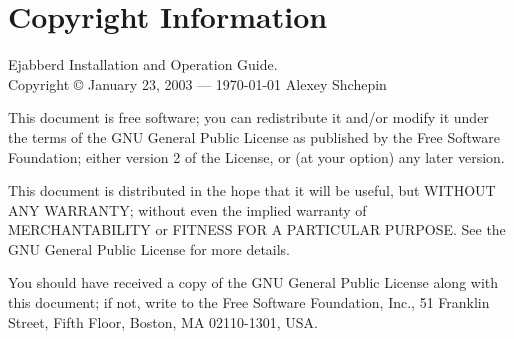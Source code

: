 \documentclass[a4paper,10pt]{article}
\newcommand{\ind}[1]{\begin{latexonly}\index{#1}\end{latexonly}}
\newcommand{\bracehack}{\def\{{\char"7B}\def\}{\char"7D}}
\newcommand{\titem}[1]{\item[\bracehack\texttt{#1}]}
\newcommand{\Jabber}{Jabber}
\begin{document}
\section{Copyright Information}
\label{copyright}

Ejabberd Installation and Operation Guide.\\
Copyright \copyright{} January 23, 2003 --- \today{} Alexey Shchepin

This document is free software; you can redistribute it and/or
modify it under the terms of the GNU General Public License
as published by the Free Software Foundation; either version 2
of the License, or (at your option) any later version.

This document is distributed in the hope that it will be useful,
but WITHOUT ANY WARRANTY; without even the implied warranty of
MERCHANTABILITY or FITNESS FOR A PARTICULAR PURPOSE. See the
GNU General Public License for more details.

You should have received a copy of the GNU General Public License along with
this document; if not, write to the Free Software Foundation, Inc., 51 Franklin
Street, Fifth Floor, Boston, MA 02110-1301, USA.






\begin{latexonly}
\printindex
\end{latexonly}
\end{document}
